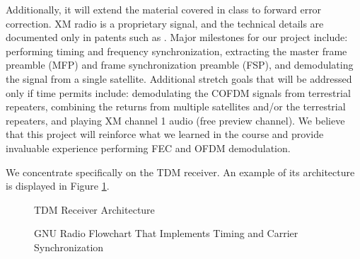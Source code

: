 \documentclass[conference,onecolumn]{IEEEtran}
\begin{document}

 Additionally, it will extend the material covered in class to forward error correction. XM radio is a proprietary signal, and the technical details are documented only in patents such as \cite{a2008_us8260192b2, marko_2012_us8667344b2}. Major milestones for our project include: performing timing and frequency synchronization, extracting the master frame preamble (MFP) and frame synchronization preamble (FSP), and demodulating the signal from a single satellite. Additional stretch goals that will be addressed only if time permits include: demodulating the COFDM signals from terrestrial repeaters, combining the returns from multiple satellites and/or the terrestrial repeaters, and playing XM channel 1 audio (free preview channel). We believe that this project will reinforce what we learned in the course and provide invaluable experience performing FEC and OFDM demodulation.




 We concentrate specifically on the TDM receiver. An example of its architecture is displayed in Figure \ref{fig::tdm_receiver}. 

\begin{figure}[H]
	\centerline{}
	\caption{TDM Receiver Architecture \cite{a2008_us8260192b2}}
	\label{fig::tdm_receiver}
\end{figure}

\begin{figure}[H]
	\centerline{}
	\caption{GNU Radio Flowchart That Implements Timing and Carrier Synchronization}
	\label{fig::timing_carrier_sync}
\end{figure}
\end{document}
